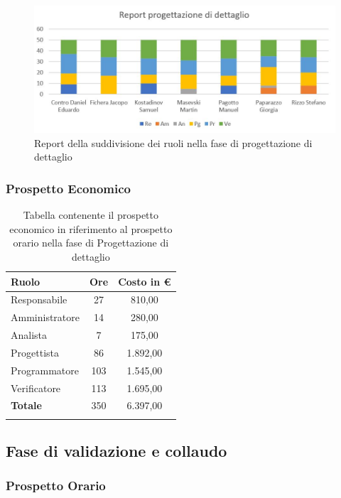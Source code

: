\documentclass[../piano_di_progetto.tex]{subfiles}
\begin{document}
\begin{figure}[H]
\centering
\includegraphics[width=12cm]{componenti/img/report_prog_dett}
\caption{Report della suddivisione dei ruoli nella fase di progettazione di dettaglio}
\end{figure}

\newpage

\subsubsection{Prospetto Economico}

\begin{center}
	\begin{longtable}{|l|c|c|}
		\hline
		\rowcolor{lightgray}
		\textbf{Ruolo} & \textbf{Ore} & \textbf{Costo in €}\\
		\hline
		Responsabile & 27 & 810,00\\
		Amministratore & 14 & 280,00\\
		Analista & 7 & 175,00\\
		Progettista & 86 & 1.892,00\\
		Programmatore & 103 & 1.545,00\\
		Verificatore & 113 & 1.695,00\\
		\hline
		\textbf{Totale} & 350 & 6.397,00\\
		\hline
		\rowcolor{white}
		\caption{Tabella contenente il prospetto economico in riferimento al prospetto orario nella fase di Progettazione di dettaglio}
	\end{longtable}
\end{center}

\subsection{ Fase di validazione e collaudo}%
\label{sub:fase_valid_collaudo}
\subsubsection{Prospetto Orario}
\end{document}
